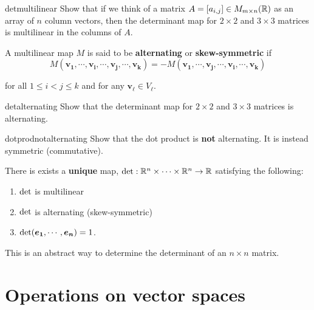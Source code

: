 \begin{problem}{detmultilinear}
    Show that if we think of a matrix $A = [a_{i,j}] \in M_{m \times n}(\mathbb{R})$ as an array of $n$ column vectors, then the determinant map for $2 \times 2$ and $3 \times 3$ matrices is multilinear in the columns of $A$.
\end{problem}

\begin{definition}
    A multilinear map $M$ is said to be \textbf{alternating} or \textbf{skew-symmetric} if 
    $$M(\bm{v_1}, \cdots, \bm{v_i}, \cdots , \bm{v_j}, \cdots, \bm{v_k}) = -M(\bm{v_1}, \cdots, \bm{v_j}, \cdots , \bm{v_i}, \cdots, \bm{v_k}) $$
    
    for all $1 \leq i < j \leq k$ and for any $\bm{v_\ell} \in V_\ell$.
    
    \end{definition}
    
    \begin{problem}{detalternating}
        Show that the determinant map for $2 \times 2$ and $3 \times 3$ matrices is alternating.
    \end{problem}
    
    \begin{problem}{dotprodnotalternating}
        Show that the dot product is \textbf{not} alternating.  It is instead symmetric (commutative).
    \end{problem}

\begin{definition}
There is exists a \textbf{unique} map, $\textnormal{det} : \mathbb{R}^n \times \cdots \times \mathbb{R}^n \to \mathbb{R}$ satisfying the following:
\begin{enumerate}
    \item $\textnormal{det}$ is multilinear
    \item $\textnormal{det}$ is alternating (skew-symmetric)
    \item $\textnormal{det}(\bm{e_1}, \cdots, \bm{e_n}) = 1$.
\end{enumerate}

This is an abstract way to determine the determinant of an $n\times n$ matrix.
\end{definition}


\section{Operations on vector spaces}\label{operations}

